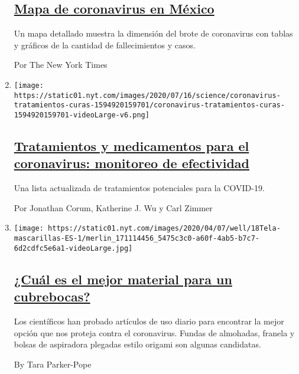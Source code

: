 \begin{enumerate}
  \hypertarget{mapa-de-coronavirus-en-muxe9xico}{%
  \subsection{\texorpdfstring{\href{/es/interactive/2020/espanol/america-latina/coronavirus-en-mexico.html}{Mapa
  de coronavirus en
  México}}{Mapa de coronavirus en México}}\label{mapa-de-coronavirus-en-muxe9xico}}

  Un mapa detallado muestra la dimensión del brote de coronavirus con
  tablas y gráficos de la cantidad de fallecimientos y casos.

  Por The New York Times
\item
  \texttt{[image: https://static01.nyt.com/images/2020/07/16/science/coronavirus-tratamientos-curas-1594920159701/coronavirus-tratamientos-curas-1594920159701-videoLarge-v6.png]}

  \hypertarget{tratamientos-y-medicamentos-para-el-coronavirus-monitoreo-de-efectividad}{%
  \subsection{\texorpdfstring{\href{/es/interactive/2020/science/coronavirus-tratamientos-curas.html}{Tratamientos
  y medicamentos para el coronavirus: monitoreo de
  efectividad}}{Tratamientos y medicamentos para el coronavirus: monitoreo de efectividad}}\label{tratamientos-y-medicamentos-para-el-coronavirus-monitoreo-de-efectividad}}

  Una lista actualizada de tratamientos potenciales para la COVID-19.

  Por Jonathan Corum, Katherine J. Wu y Carl Zimmer
\item
  \texttt{[image: https://static01.nyt.com/images/2020/04/07/well/18Tela-mascarillas-ES-1/merlin\_171114456\_5475c3c0-a60f-4ab5-b7c7-6d2cdfc5e6a1-videoLarge.jpg]}

  \hypertarget{cuuxe1l-es-el-mejor-material-para-un-cubrebocas}{%
  \subsection{\texorpdfstring{\href{/es/2020/04/18/espanol/material-mascarillas-virus.html}{¿Cuál
  es el mejor material para un
  cubrebocas?}}{¿Cuál es el mejor material para un cubrebocas?}}\label{cuuxe1l-es-el-mejor-material-para-un-cubrebocas}}

  Los científicos han probado artículos de uso diario para encontrar la
  mejor opción que nos proteja contra el coronavirus. Fundas de
  almohadas, franela y bolsas de aspiradora plegadas estilo origami son
  algunas candidatas.

  By Tara Parker-Pope
\end{enumerate}

